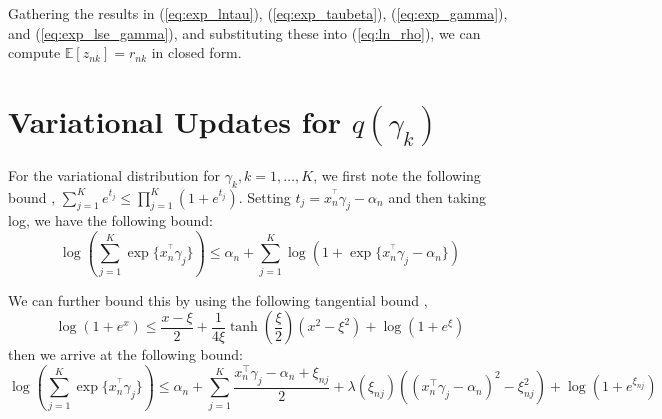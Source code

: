 \documentclass[twoside,11pt]{article}
\newcommand{\E}{\mathbb{E}}
\begin{document}
Gathering the results in (\ref{eq:exp_lntau}), (\ref{eq:exp_taubeta}), (\ref{eq:exp_gamma}), and (\ref{eq:exp_lse_gamma}), and substituting these into (\ref{eq:ln_rho}), we can compute $\E[z_{nk}] = r_{nk}$ in closed form. 



\section{Variational Updates for $q(\gamma_k)$} \label{app:gamma}  



For the variational distribution for $\gamma_k, k = 1, \ldots, K$, we first note the following bound \parencite{bouchard:07}, $\sum_{j = 1}^{K} e^{t_j} \leq \prod_{j = 1}^K (1 + e^{t_j})$. Setting $t_j = x_n^{^\intercal} \gamma_j - \alpha_{n}$ and then taking log, we have the following bound:
\begin{equation} \label{eq:log-sum-exp}
	\log \left( \sum_{j = 1}^K \exp\{ x_n^{^\intercal} \gamma_j \}\right) \leq \alpha_n + \sum_{j=1}^K \log \left( 1 + \exp \{ x_n^{^\intercal} \gamma_j - \alpha_n \}\right)
\end{equation}


We can further bound this by using the following tangential bound \parencite{jj:2001}, $$\log(1 + e^x) \leq \frac{x - \xi}{2} + \frac{1}{4\xi} \tanh \left( \frac{\xi}{2} \right) (x^2 - \xi^2) + \log\left(1 + e^{\xi}\right)$$ then we arrive at the following bound: 
\begin{equation} \label{eq:jj_bound}
	\log \left( \sum_{j = 1}^K \exp\{ x_n^{^\intercal} \gamma_j \}\right) \leq 
\alpha_n + \sum_{j = 1}^K \frac{x_n^{\intercal} \gamma_j - \alpha_n + \xi_{nj}}{2} + \lambda(\xi_{nj}) \left( (x_n^{\intercal} \gamma_j - \alpha_n)^2 - \xi_{nj}^2\right) + \log \left( 1 + e^{\xi_{nj}}\right)
\end{equation}
\end{document}
